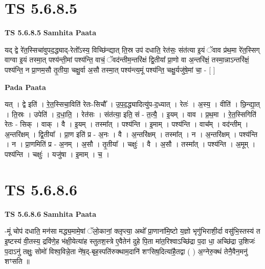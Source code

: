 \documentclass[17pt]{extarticle}
\begin{document}

\section{ TS 5.6.8.5 }

\textbf{TS 5.6.8.5 } \newline
\textbf{Samhita Paata} \newline

यद् द्वे रे॑त॒स्सिचा॑वुपद॒द्ध्याद्-रेतो᳚ऽस्य॒ विच्छि॑न्द्यात् ति॒स्र उप॑ दधाति॒ रेत॑सः॒ संत॑त्या इ॒यं ॅवाव प्र॑थ॒मा रे॑त॒स्सिग् वाग्वा इ॒यं तस्मा॒त् पश्य॑न्ती॒मां पश्य॑न्ति॒ वाचं॒ ॅवद॑न्तीम॒न्तरि॑क्षं द्वि॒तीया᳚ प्रा॒णो वा अ॒न्तरि॑क्षं॒ तस्मा॒न्नाऽन्तरि॑क्षं॒ पश्य॑न्ति॒ न प्रा॒णम॒सौ तृ॒तीया॒ चक्षु॒र्वा अ॒सौ तस्मा॒त् पश्य॑न्त्य॒मूं पश्य॑न्ति॒ चक्षु॒र्यजु॑षे॒मां चा॒ - [  ] \newline

\textbf{Pada Paata} \newline

यत् । द्वे इति॑ । रे॒त॒स्सिचा॒विति॑ रेतः-सिचौ᳚ । उ॒प॒द॒द्ध्यादित्यु॑प-द॒ध्यात् । रेतः॑ । अ॒स्य॒ । वीति॑ । छि॒न्द्या॒त् । ति॒स्रः । उपेति॑ । द॒धा॒ति॒ । रेत॑सः । संत॑त्या॒ इति॒ सं - त॒त्यै॒ । इ॒यम् । वाव । प्र॒थ॒मा । रे॒त॒स्सिगिति॑ रेतः - सिक् । वाक् । वै । इ॒यम् । तस्मा᳚त् । पश्य॑न्ति । इ॒माम् । पश्य॑न्ति । वाच᳚म् । वद॑न्तीम् । अ॒न्तरि॑क्षम् । द्वि॒तीया᳚ । प्रा॒ण इति॑ प्र - अ॒नः । वै । अ॒न्तरि॑क्षम् । तस्मा᳚त् । न । अ॒न्तरि॑क्षम् । पश्य॑न्ति । न । प्रा॒णमिति॑ प्र - अ॒नम् । अ॒सौ । तृ॒तीया᳚ ।   चक्षुः॑ । वै । अ॒सौ । तस्मा᳚त् । पश्य॑न्ति । अ॒मूम् । पश्य॑न्ति । चक्षुः॑ । यजु॑षा । इ॒माम् । च॒ ।  \newline





\section{ TS 5.6.8.6 }

\textbf{TS 5.6.8.6 } \newline
\textbf{Samhita Paata} \newline

-मूं चोप॑ दधाति॒ मन॑सा मद्ध्य॒मामे॒षां ॅलो॒कानां॒ क्लृप्त्या॒ अथो᳚ प्रा॒णाना॑मि॒ष्टो य॒ज्ञो भृगु॑भिराशी॒र्दा वसु॑भि॒स्तस्य॑ त इ॒ष्टस्य॑ वी॒तस्य॒ द्रवि॑णे॒ह भ॑क्षी॒येत्या॑ह स्तुतश॒स्त्रे ए॒वैतेन॑ दुहे पि॒ता मा॑त॒रिश्वाऽच्छि॑द्रा प॒दा धा॒ अच्छि॑द्रा उ॒शिजः॑ प॒दाऽनु॑ तक्षुः॒ सोमो॑ विश्व॒विन्ने॒ता ने॑ष॒द्-बृह॒स्पति॑रुक्थाम॒दानि॑ शꣳसिष॒दित्या॑है॒तद्वा ( ) अ॒ग्नेरु॒क्थं तेनै॒वैन॒मनु॑ शꣳसति ॥ \newline
\end{document}
